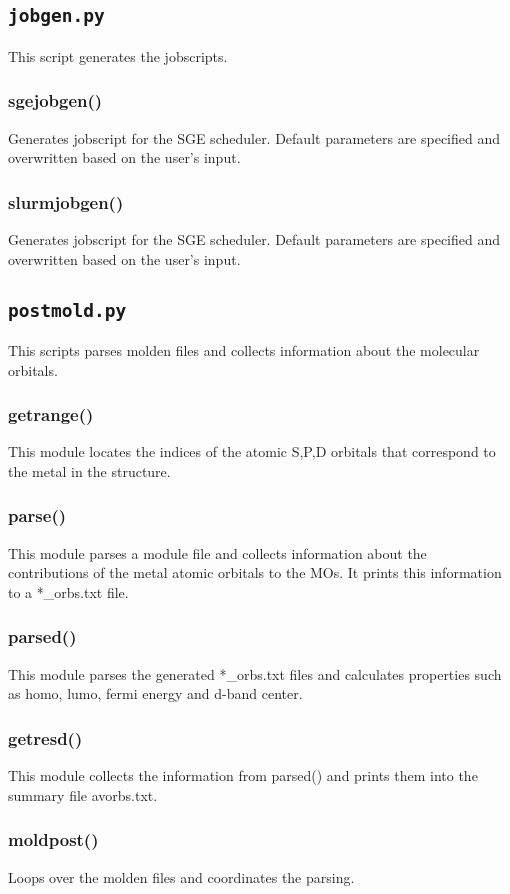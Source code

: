 \documentclass[a4paper,12pt]{assignment}
\begin{document}
\subsection{\texttt{jobgen.py}}
This script generates the jobscripts.
\subsubsection{sgejobgen()}
Generates jobscript for the SGE scheduler. Default parameters are specified and overwritten based on the user's input. 
\subsubsection{slurmjobgen()}
Generates jobscript for the SGE scheduler. Default parameters are specified and overwritten based on the user's input. 

\subsection{\texttt{postmold.py}}
This scripts parses molden files and collects information about the molecular orbitals.
\subsubsection{getrange()}
This module locates the indices of the atomic S,P,D orbitals that correspond to the metal in the structure.
\subsubsection*{parse()}
This module parses a module file and collects information about the contributions of the metal atomic orbitals to the MOs. It prints this information to a *\_orbs.txt file.
\subsubsection{parsed()}
This module parses the generated *\_orbs.txt files and calculates properties such as homo, lumo, fermi energy and d-band center.
\subsubsection{getresd()}
This module collects the information from parsed() and prints them into the summary file avorbs.txt.
\subsubsection{moldpost()}
Loops over the molden files and coordinates the parsing.
\end{document}
